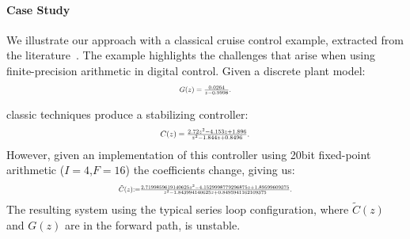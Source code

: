 \documentclass[final]{sig-alternate-05-2015}
\begin{document}
%

\paragraph{Case Study} \label{sec:running-ex}

We illustrate our approach with a classical cruise control example,
extracted from the literature~\cite{Astrom08}.  The example highlights the
challenges that arise when using finite-precision arithmetic in digital
control.  Given a discrete plant model:
%
\begin{equation}
\label{Eq:running-example-plant}
\resizebox{.15\textwidth}{!}{
$G(z) = \frac{0.0264}{z-0.9998}$.
}
\end{equation}

classic techniques produce a stabilizing controller:
%
\begin{equation}
\label{Eq:running-example-controller}
\resizebox{.25\textwidth}{!}{
$C(z) = \frac{2.72z^2 - 4.153z + 1.896}{z^2 - 1.844z + 0.8496}$.
}
\end{equation}
%
However, given an implementation of this controller using 20bit fixed-point arithmetic 
($I=4$,$F=16$) the coefficients change, giving us:
%
\begin{equation}
\label{Eq:running-example-controller-quantized}
\resizebox{.47\textwidth}{!}{
$\tilde{C}(z) {:=} \frac{2.7199859619140625z^2{-}4.1529998779296875z
{+}1.89599609375}{z^2{-}1.843994140625z+0.8495941162109375}$. 
}
\end{equation} 
%
The resulting system using the typical series loop configuration, where
$\tilde{C}(z)$ and $G(z)$ are in the forward path, is unstable. 
\end{document}
